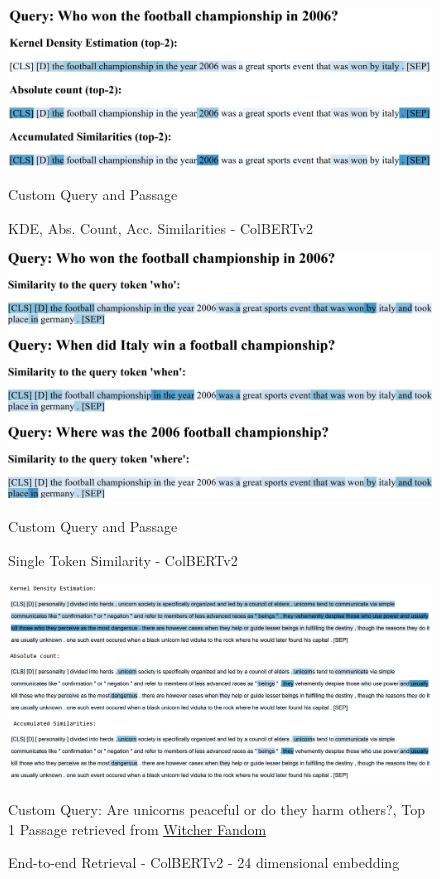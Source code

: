 \documentclass[11pt]{article}
\begin{document}
\begin{figure}[h]
    \begin{center}
    \includegraphics[width=1.0\textwidth]{"./images/heatmap1.png"}
    \end{center}
    \caption{KDE, Abs. Count, Acc. Similarities - ColBERTv2 }
    \small
    \center Custom Query and Passage
    \label{fig:example1}
\end{figure}

\begin{figure}[h]
    \begin{center}
    \includegraphics[width=1.0\textwidth]{"./images/first_word_heatmap.png"}
    \end{center}
    \caption{Single Token Similarity - ColBERTv2 }
    \small
    \center Custom Query and Passage
    \label{fig:example2}
\end{figure}

\begin{figure}[h]
    \begin{center}
    \includegraphics[width=1.0\textwidth]{"./images/unicorns.png"}
    \end{center}
    \caption{End-to-end Retrieval - ColBERTv2 - 24 dimensional embedding}
    \small
    \center Custom Query: Are unicorns peaceful or do they harm others?, Top 1 Passage retrieved from \href{https://witcher.fandom.com}{Witcher Fandom}
    \label{fig:example3}
\end{figure}
\end{document}
